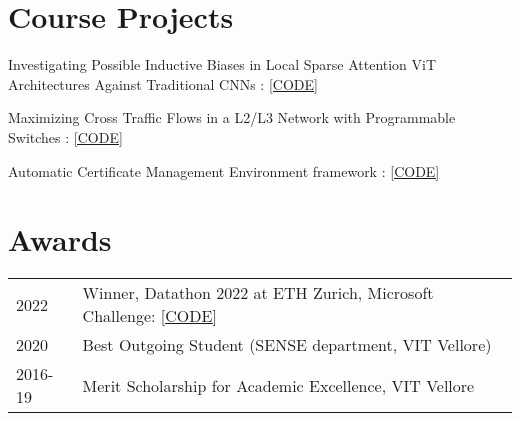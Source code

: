 \documentclass[]{onepage}
\begin{document}
\begin{minipage}[t]{0.66\textwidth}
\section{Course Projects}
\vspace{0.2cm}
\begin{tightemize}
\item Investigating Possible Inductive Biases in Local Sparse Attention ViT Architectures Against Traditional CNNs :  {\href{https://github.com/Siddhant-Ray/Deep-Learning-Project-2021}{[CODE]}}
\item Maximizing Cross Traffic Flows in a L2/L3 Network with Programmable Switches : {\href{https://github.com/Siddhant-Ray/Advnet-Project-ETH}{[CODE]}}
\item Automatic Certificate Management Environment framework : {\href{https://github.com/Siddhant-Ray/NetworkSecurity-ACME-Project}{[CODE]}}
\end{tightemize}

\vspace{-0.1cm}
\section{Awards} 
\begin{tabular}{ll}
2022         & Winner, Datathon 2022 at ETH Zurich, Microsoft Challenge:  {\href{https://github.com/FatjonZOGAJ/multilingual-text-analytics}{[CODE]}} \\
2020	     &  Best Outgoing Student (SENSE department, VIT Vellore)\\
2016-19      & Merit Scholarship for Academic Excellence, VIT Vellore
\end{tabular}
\sectionsep

\end{minipage} 
\end{document}
